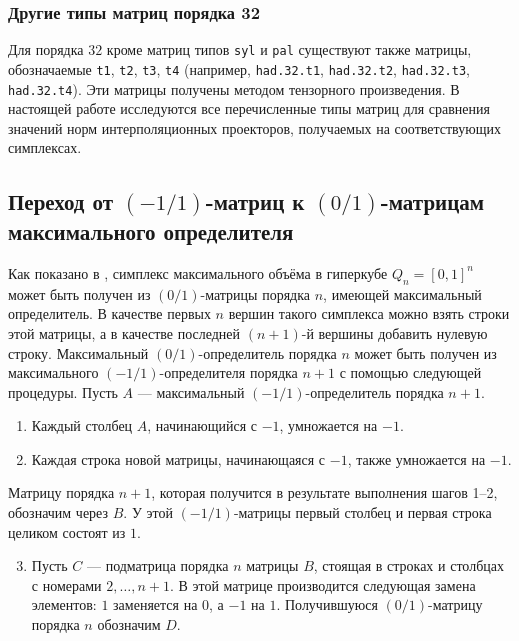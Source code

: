 \documentclass[a4paper,12pt]{article}
\theoremstyle{indented}
\begin{document}
\subsubsection{Другие типы матриц порядка 32}

Для порядка $32$ кроме матриц типов \texttt{syl} и \texttt{pal} существуют также матрицы, обозначаемые \texttt{t1}, \texttt{t2}, \texttt{t3}, \texttt{t4} (например, \texttt{had.32.t1}, \texttt{had.32.t2}, \texttt{had.32.t3}, \texttt{had.32.t4}). Эти матрицы получены методом тензорного произведения. В настоящей работе исследуются все перечисленные типы матриц для сравнения значений норм интерполяционных проекторов, получаемых на соответствующих симплексах.

\subsection{Переход от $(-1/1)$-матриц к $(0/1)$-матрицам максимального определителя}

Как показано в \cite{nevsky_geo}, симплекс максимального объёма в гиперкубе $Q_n = [0,1]^n$ может быть получен из $(0/1)$-матрицы порядка $n$, имеющей максимальный определитель. В качестве первых $n$ вершин такого симплекса можно взять строки этой матрицы, а в качестве последней $(n+1)$-й вершины добавить нулевую строку.
Максимальный $(0/1)$-определитель порядка $n$ может быть получен из максимального $(-1/1)$-определителя порядка $n+1$ с помощью следующей процедуры. Пусть $A$ — максимальный $(-1/1)$-определитель порядка $n+1$.

\begin{enumerate}
    \item Каждый столбец $A$, начинающийся с $-1$, умножается на $-1$.
    \item Каждая строка новой матрицы, начинающаяся с $-1$, также умножается на $-1$.
\end{enumerate}

Матрицу порядка $n+1$, которая получится в результате выполнения шагов 1–2, обозначим через $B$. У этой $(-1/1)$-матрицы первый столбец и первая строка целиком состоят из $1$.

\begin{enumerate}
    \setcounter{enumi}{2}
    \item Пусть $C$ — подматрица порядка $n$ матрицы $B$, стоящая в строках и столбцах с номерами $2, \dots, n+1$. В этой матрице производится следующая замена элементов: $1$ заменяется на $0$, а $-1$ на $1$. Получившуюся $(0/1)$-матрицу порядка $n$ обозначим $D$.
\end{enumerate}
\end{document}

